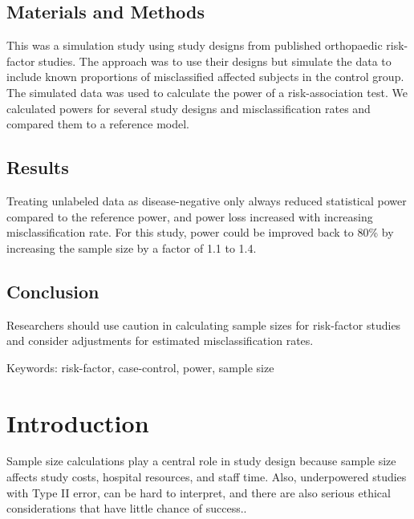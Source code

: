 \documentclass[
]{article}
\begin{document}
\hypertarget{materials-and-methods}{%
\subsection{Materials and Methods}\label{materials-and-methods}}

This was a simulation study using study designs from published
orthopaedic risk-factor studies. The approach was to use their designs
but simulate the data to include known proportions of misclassified
affected subjects in the control group. The simulated data was used to
calculate the power of a risk-association test. We calculated powers for
several study designs and misclassification rates and compared them to a
reference model.

\hypertarget{results}{%
\subsection{Results}\label{results}}

Treating unlabeled data as disease-negative only always reduced
statistical power compared to the reference power, and power loss
increased with increasing misclassification rate. For this study, power
could be improved back to 80\% by increasing the sample size by a factor
of 1.1 to 1.4.

\hypertarget{conclusion}{%
\subsection{Conclusion}\label{conclusion}}

Researchers should use caution in calculating sample sizes for
risk-factor studies and consider adjustments for estimated
misclassification rates.

Keywords: risk-factor, case-control, power, sample size

\newpage

\hypertarget{introduction}{%
\section{Introduction}\label{introduction}}

Sample size calculations play a central role in study design because
sample size affects study costs, hospital resources, and staff time.
Also, underpowered studies with Type II error, can be hard to interpret,
and there are also serious ethical considerations that have little
chance of success.\cite{ halpern2002continuing, hofmeister2007sample}.
\end{document}
